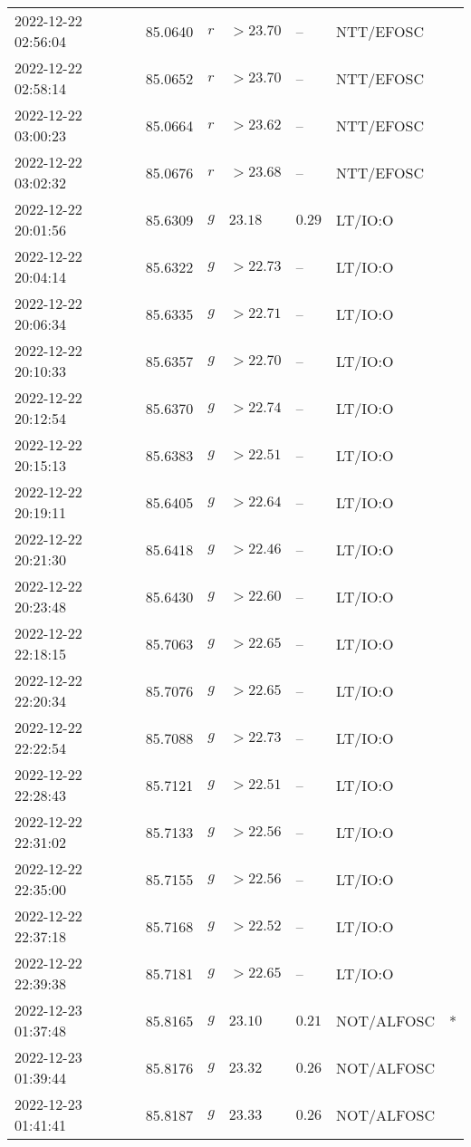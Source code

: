 \documentclass{nature_plusfigure}
\begin{document}
\begin{supplement}
\begin{center}
\begin{longtable}{lllllll}
2022-12-22 02:56:04 & 85.0640 & $r$ & $>23.70$ & -- & NTT/EFOSC &  \\ 
2022-12-22 02:58:14 & 85.0652 & $r$ & $>23.70$ & -- & NTT/EFOSC &  \\ 
2022-12-22 03:00:23 & 85.0664 & $r$ & $>23.62$ & -- & NTT/EFOSC &  \\ 
2022-12-22 03:02:32 & 85.0676 & $r$ & $>23.68$ & -- & NTT/EFOSC &  \\ 
2022-12-22 20:01:56 & 85.6309 & $g$ & $23.18$ & $0.29$ & LT/IO:O &  \\ 
2022-12-22 20:04:14 & 85.6322 & $g$ & $>22.73$ & -- & LT/IO:O &  \\ 
2022-12-22 20:06:34 & 85.6335 & $g$ & $>22.71$ & -- & LT/IO:O &  \\ 
2022-12-22 20:10:33 & 85.6357 & $g$ & $>22.70$ & -- & LT/IO:O &  \\ 
2022-12-22 20:12:54 & 85.6370 & $g$ & $>22.74$ & -- & LT/IO:O &  \\ 
2022-12-22 20:15:13 & 85.6383 & $g$ & $>22.51$ & -- & LT/IO:O &  \\ 
2022-12-22 20:19:11 & 85.6405 & $g$ & $>22.64$ & -- & LT/IO:O &  \\ 
2022-12-22 20:21:30 & 85.6418 & $g$ & $>22.46$ & -- & LT/IO:O &  \\ 
2022-12-22 20:23:48 & 85.6430 & $g$ & $>22.60$ & -- & LT/IO:O &  \\ 
2022-12-22 22:18:15 & 85.7063 & $g$ & $>22.65$ & -- & LT/IO:O &  \\ 
2022-12-22 22:20:34 & 85.7076 & $g$ & $>22.65$ & -- & LT/IO:O &  \\ 
2022-12-22 22:22:54 & 85.7088 & $g$ & $>22.73$ & -- & LT/IO:O &  \\ 
2022-12-22 22:28:43 & 85.7121 & $g$ & $>22.51$ & -- & LT/IO:O &  \\ 
2022-12-22 22:31:02 & 85.7133 & $g$ & $>22.56$ & -- & LT/IO:O &  \\ 
2022-12-22 22:35:00 & 85.7155 & $g$ & $>22.56$ & -- & LT/IO:O &  \\ 
2022-12-22 22:37:18 & 85.7168 & $g$ & $>22.52$ & -- & LT/IO:O &  \\ 
2022-12-22 22:39:38 & 85.7181 & $g$ & $>22.65$ & -- & LT/IO:O &  \\ 
2022-12-23 01:37:48 & 85.8165 & $g$ & $23.10$ & $0.21$ & NOT/ALFOSC & * \\ 
2022-12-23 01:39:44 & 85.8176 & $g$ & $23.32$ & $0.26$ & NOT/ALFOSC &  \\ 
2022-12-23 01:41:41 & 85.8187 & $g$ & $23.33$ & $0.26$ & NOT/ALFOSC &  \\ 

\end{longtable}
\end{center}
\end{supplement}
\end{document}
